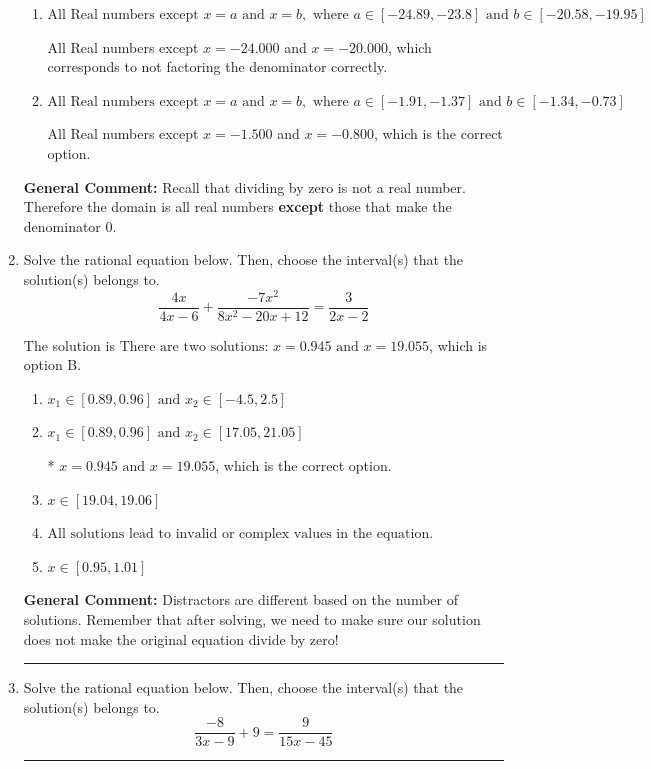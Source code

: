 \documentclass{extbook}[14pt]
\newcommand{\litem}[1]{\item #1

\rule{\textwidth}{0.4pt}}
\begin{document}
\begin{enumerate}
{\begin{enumerate}[label=\Alph*.]
All Real numbers except $x = -1.500$, which corresponds to removing only 1 value from the denominator.
\item \( \text{All Real numbers except } x = a \text{ and } x = b, \text{ where } a \in [-24.89, -23.8] \text{ and } b \in [-20.58, -19.95] \)

All Real numbers except $x = -24.000$ and $x = -20.000$, which corresponds to not factoring the denominator correctly.
\item \( \text{All Real numbers except } x = a \text{ and } x = b, \text{ where } a \in [-1.91, -1.37] \text{ and } b \in [-1.34, -0.73] \)

All Real numbers except $x = -1.500$ and $x = -0.800$, which is the correct option.
\end{enumerate}

\textbf{General Comment:} Recall that dividing by zero is not a real number. Therefore the domain is all real numbers \textbf{except} those that make the denominator 0.
}
\litem{
Solve the rational equation below. Then, choose the interval(s) that the solution(s) belongs to.
\[ \frac{4x}{4x -6} + \frac{-7x^{2}}{8x^{2} -20 x + 12} = \frac{3}{2x -2} \]

The solution is \( \text{There are two solutions: } x = 0.945 \text{ and } x = 19.055 \), which is option B.\begin{enumerate}[label=\Alph*.]
\item \( x_1 \in [0.89, 0.96] \text{ and } x_2 \in [-4.5,2.5] \)


\item \( x_1 \in [0.89, 0.96] \text{ and } x_2 \in [17.05,21.05] \)

* $x = 0.945 \text{ and } x = 19.055$, which is the correct option.
\item \( x \in [19.04,19.06] \)


\item \( \text{All solutions lead to invalid or complex values in the equation.} \)


\item \( x \in [0.95,1.01] \)


\end{enumerate}

\textbf{General Comment:} Distractors are different based on the number of solutions. Remember that after solving, we need to make sure our solution does not make the original equation divide by zero!
}
\litem{
Solve the rational equation below. Then, choose the interval(s) that the solution(s) belongs to.
\[ \frac{-8}{3x -9} + 9 = \frac{9}{15x -45} \]

}
\end{enumerate}
\end{document}
